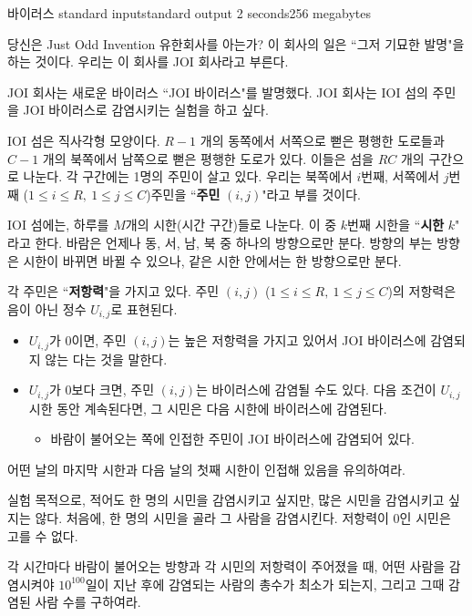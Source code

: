 \begin{problem}{바이러스}
	{standard input}{standard output}
	{2 seconds}{256 megabytes}{}
	
	당신은 Just Odd Invention 유한회사를 아는가? 이 회사의 일은 ``그저 기묘한 발명"을 하는 것이다. 우리는 이 회사를 JOI 회사라고 부른다.
	
	JOI 회사는 새로운 바이러스 ``JOI 바이러스"를 발명했다. JOI 회사는 IOI 섬의 주민을 JOI 바이러스로 감염시키는 실험을 하고 싶다.
	
	IOI 섬은 직사각형 모양이다. $R-1$ 개의 동쪽에서 서쪽으로 뻗은 평행한 도로들과 $C-1$ 개의 북쪽에서 남쪽으로 뻗은 평행한 도로가 있다. 이들은 섬을 $RC$ 개의 구간으로 나눈다. 각 구간에는 1명의 주민이 살고 있다. 우리는 북쪽에서 $i$번째, 서쪽에서 $j$번째 ($1 \le i \le R, \ 1 \le j \le C$)주민을 ``\textbf{주민} $(i, j)$"라고 부를 것이다.
	
	IOI 섬에는, 하루를 $M$개의 시한(시간 구간)들로 나눈다. 이 중 $k$번째 시한을 ``\textbf{시한} $k$" 라고 한다. 바람은 언제나 동, 서, 남, 북 중 하나의 방향으로만 분다. 방향의 부는 방향은 시한이 바뀌면 바뀔 수 있으나, 같은 시한 안에서는 한 방향으로만 분다.
	
	각 주민은 ``\textbf{저항력}"을 가지고 있다. 주민 $(i, j)$ ($1 \le i \le R, \ 1 \le j \le C$)의 저항력은 음이 아닌 정수 $U_{i, j}$로 표현된다.
	
	
	\begin{itemize}
		\item $U_{i, j}$가 0이면, 주민 $(i, j)$는 높은 저항력을 가지고 있어서 JOI 바이러스에 감염되지 않는 다는 것을 말한다.
		\item $U_{i, j}$가 0보다 크면, 주민 $(i, j)$는 바이러스에 감염될 수도 있다. 다음 조건이 $U_{i, j}$ 시한 동안 계속된다면, 그 시민은 다음 시한에 바이러스에 감염된다.
		\begin{itemize}
			\item 바람이 불어오는 쪽에 인접한 주민이 JOI 바이러스에 감염되어 있다.
		\end{itemize}
	\end{itemize}

	어떤 날의 마지막 시한과 다음 날의 첫째 시한이 인접해 있음을 유의하여라.
	
	실험 목적으로, 적어도 한 명의 시민을 감염시키고 싶지만, 많은 시민을 감염시키고 싶지는 않다. 처음에, 한 명의 시민을 골라 그 사람을 감염시킨다. 저항력이 0인 시민은 고를 수 없다.
	
	각 시간마다 바람이 불어오는 방향과 각 시민의 저항력이 주어졌을 때, 어떤 사람을 감염시켜야 $10^{100}$일이 지난 후에 감염되는 사람의 총수가 최소가 되는지, 그리고 그때 감염된 사람 수를 구하여라.
	

\end{problem}
